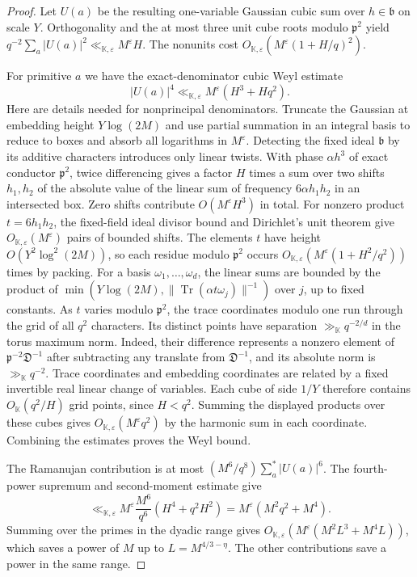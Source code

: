 \documentclass[11pt,letterpaper]{article}
\theoremstyle{definition}
\numberwithin{equation}{section}
\begin{document}
\begin{proof}
Let $U(a)$ be the resulting one-variable Gaussian cubic sum over
$h\in\mathfrak b$ on scale $Y$. Orthogonality and the at most three unit
cube roots modulo $\mathfrak p^2$ yield
$q^{-2}\sum_a|U(a)|^2\ll_{\mathbb K,\varepsilon}M^\varepsilon H$.
The nonunits cost $O_{\mathbb K,\varepsilon}(M^\varepsilon(1+H/q)^2)$.

For primitive $a$ we have the exact-denominator cubic Weyl estimate
\[
 |U(a)|^4\ll_{\mathbb K,\varepsilon} M^\varepsilon(H^3+Hq^2).
\]
Here are details needed for nonprincipal denominators. Truncate the
Gaussian at embedding height $Y\log(2M)$ and use partial summation in
an integral basis to reduce to boxes and absorb all logarithms in
$M^\varepsilon$. Detecting the fixed ideal $\mathfrak b$ by its additive
characters introduces only linear twists. With phase $\alpha h^3$ of
exact conductor $\mathfrak p^2$, twice differencing gives a factor $H$
times a sum over two shifts $h_1,h_2$ of the absolute value of the linear
sum of frequency $6\alpha h_1h_2$ in an intersected box. Zero shifts
contribute $O(M^\varepsilon H^3)$ in total. For nonzero product
$t=6h_1h_2$, the fixed-field ideal divisor bound and Dirichlet's unit
theorem give $O_{\mathbb K,\varepsilon}(M^\varepsilon)$ pairs of bounded
shifts. The elements $t$ have height $O(Y^2\log^2(2M))$, so each residue
modulo $\mathfrak p^2$ occurs
$O_{\mathbb K,\varepsilon}(M^\varepsilon(1+H^2/q^2))$ times by packing.
For a basis $\omega_1,\ldots,\omega_d$, the linear sums are bounded by
the product of $\min(Y\log(2M),\|\operatorname{Tr}(\alpha t\omega_j)\|^{-1})$
over $j$, up to fixed constants. As $t$ varies modulo $\mathfrak p^2$,
the trace coordinates modulo one run through the grid of all
$q^2$ characters. Its distinct points have separation
$\gg_{\mathbb K}q^{-2/d}$ in the torus maximum norm. Indeed, their
difference represents a nonzero element of
$\mathfrak p^{-2}\mathfrak D^{-1}$ after subtracting any translate from
$\mathfrak D^{-1}$, and its absolute norm is $\gg_{\mathbb K}q^{-2}$.
Trace coordinates and embedding coordinates are related by a fixed
invertible real linear change of variables. Each cube of side $1/Y$
therefore contains $O_{\mathbb K}(q^2/H)$ grid points, since $H<q^2$.
Summing the displayed products over these cubes gives
$O_{\mathbb K,\varepsilon}(M^\varepsilon q^2)$ by the harmonic sum in
each coordinate. Combining the estimates proves the Weyl bound.

The Ramanujan contribution is at most $(M^6/q^8)\sum_a^* |U(a)|^6$.
The fourth-power supremum and second-moment estimate give
\[
 \ll_{\mathbb K,\varepsilon}M^\varepsilon
     \frac{M^6}{q^6}(H^4+q^2H^2)
   =M^\varepsilon(M^2q^2+M^4).
\]
Summing over the primes in the dyadic range gives
$O_{\mathbb K,\varepsilon}(M^\varepsilon(M^2L^3+M^4L))$, which saves a
power of $M$ up to $L=M^{4/3-\eta}$. The other contributions save a
power in the same range.
\end{proof}
\end{document}
